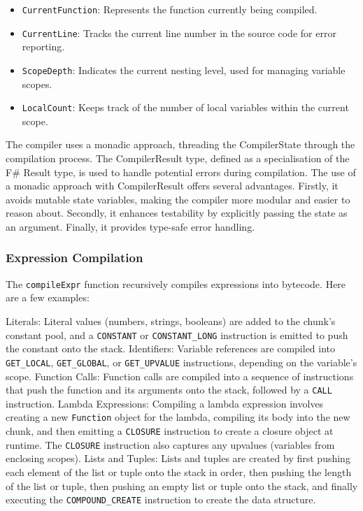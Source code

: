 \begin{itemize}
\item \texttt{CurrentFunction}:  Represents the function currently being compiled.
\item \texttt{CurrentLine}: Tracks the current line number in the source code for error reporting.
\item \texttt{ScopeDepth}:  Indicates the current nesting level, used for managing variable scopes.
\item \texttt{LocalCount}: Keeps track of the number of local variables within the current scope.
\end{itemize}

The compiler uses a monadic approach, threading the CompilerState through the compilation process.
The CompilerResult type, defined as a specialisation of the F\# Result type, is used to handle potential errors during 
compilation.
The use of a monadic approach with CompilerResult offers several advantages.
Firstly, it avoids mutable state variables, making the compiler more modular and easier to reason about.
Secondly, it enhances testability by explicitly passing the state as an argument.
Finally, it provides type-safe error handling.

\subsubsection{Expression Compilation}

The \texttt{compileExpr} function recursively compiles expressions into bytecode.
Here are a few examples:

Literals: Literal values (numbers, strings, booleans) are added to the chunk's constant pool, and a \texttt{CONSTANT} or \texttt{CONSTANT\_LONG} instruction is emitted to push the constant onto the stack.
Identifiers: Variable references are compiled into \texttt{GET\_LOCAL}, \texttt{GET\_GLOBAL}, or 
\texttt{GET\_UPVALUE} instructions, depending on the variable's scope.
Function Calls: Function calls are compiled into a sequence of instructions that push the function and its arguments onto the stack, followed by a \texttt{CALL} instruction.
Lambda Expressions: Compiling a lambda expression involves creating a new \texttt{Function} object for the lambda, compiling its body into the new chunk, and then emitting a \texttt{CLOSURE} instruction to create a closure object at runtime.
The \texttt{CLOSURE} instruction also captures any upvalues (variables from enclosing scopes).
Lists and Tuples: Lists and tuples are created by first pushing each element of the list or tuple onto the stack in 
order, then pushing the length of the list or tuple, then pushing an empty list or tuple onto the stack, and finally executing the \texttt{COMPOUND\_CREATE} instruction to create the data structure.

